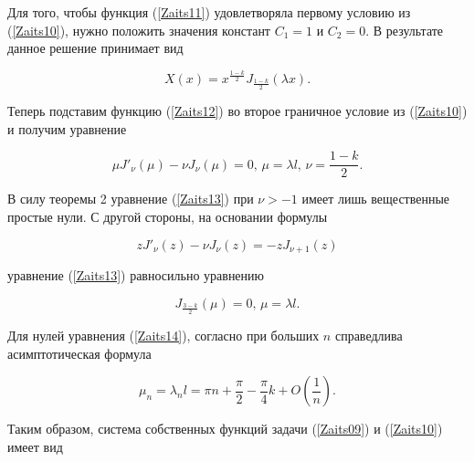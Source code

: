 Для того, чтобы функция (\ref{Zaits11}) удовлетворяла первому условию из (\ref{Zaits10}), нужно положить значения констант $C_1=1$ и $C_2=0$. В результате данное решение принимает вид

\begin{equation}

\label{Zaits12}

X(x)=x^{\frac{1-k}{2}}J_{\frac{1-k}{2}}(\lambda x).

\end{equation}



Теперь подставим функцию (\ref{Zaits12}) во второе граничное условие из (\ref{Zaits10}) и получим уравнение

\begin{equation}

\label{Zaits13}

\mu J'_\nu(\mu)-\nu J_\nu(\mu)=0,\, \mu=\lambda l,\,\nu=\frac{1-k}{2}.

\end{equation}



В силу теоремы 2 \cite[c.~310]{Zaitseva:SKB3} уравнение (\ref{Zaits13}) при $\nu>-1$ имеет лишь вещественные простые нули. С другой стороны, на основании формулы \cite[c.~305]{Zaitseva:SKB3}

$$zJ'_\nu(z)-\nu J_\nu(z)=-zJ_{\nu+1}(z)$$

уравнение (\ref{Zaits13}) равносильно уравнению

\begin{equation}

\label{Zaits14}

J_{\frac{3-k}{2}}(\mu)=0,\, \mu=\lambda l.

\end{equation}

Для нулей уравнения (\ref{Zaits14}), согласно \cite[c.~317]{Zaitseva:Olv} при больших $n$ справедлива асимптотическая формула

\begin{equation}

\label{Zaits15}

\mu_n=\lambda_nl=\pi n+\frac{\pi}{2}-\frac{\pi}{4}k+O\left(\frac1n\right).

\end{equation}



Таким образом, система собственных функций задачи (\ref{Zaits09}) и (\ref{Zaits10}) имеет вид

